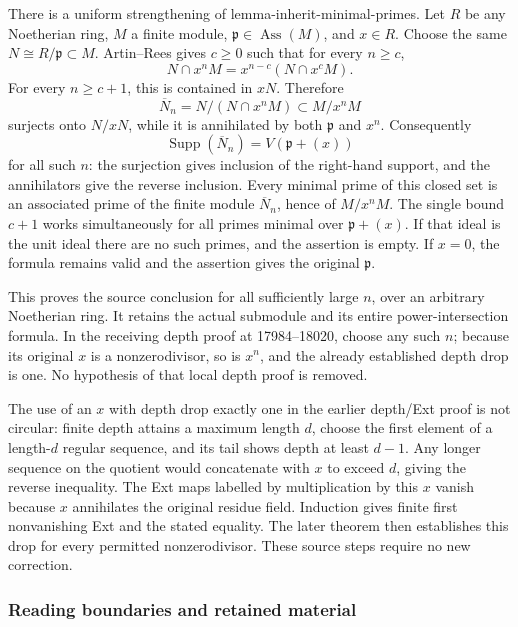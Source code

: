 There is a uniform strengthening of lemma-\AlgebraIdentifierBreak{}inherit-\AlgebraIdentifierBreak{}minimal-\AlgebraIdentifierBreak{}primes. Let \(R\) be any Noetherian ring, \(M\) a finite module, \(\mathfrak p\in\operatorname{Ass}(M)\), and \(x\in R\). Choose the same \(N\cong R/\mathfrak p\subset M\). Artin--Rees gives \(c\geq0\) such that for every \(n\geq c\), \[
N\cap x^nM=x^{n-c}(N\cap x^cM).
\] For every \(n\geq c+1\), this is contained in \(xN\). Therefore \[
\overline N_n=N/(N\cap x^nM)\subset M/x^nM
\] surjects onto \(N/xN\), while it is annihilated by both \(\mathfrak p\) and \(x^n\). Consequently \[
\operatorname{Supp}(\overline N_n)=V(\mathfrak p+(x))
\] for all such \(n\): the surjection gives inclusion of the right-hand support, and the annihilators give the reverse inclusion. Every minimal prime of this closed set is an associated prime of the finite module \(\overline N_n\), hence of \(M/x^nM\). The single bound \(c+1\) works simultaneously for all primes minimal over \(\mathfrak p+(x)\). If that ideal is the unit ideal there are no such primes, and the assertion is empty. If \(x=0\), the formula remains valid and the assertion gives the original \(\mathfrak p\).

This proves the source conclusion for all sufficiently large \(n\), over an arbitrary Noetherian ring. It retains the actual submodule and its entire power-intersection formula. In the receiving depth proof at 17984--18020, choose any such \(n\); because its original \(x\) is a nonzerodivisor, so is \(x^n\), and the already established depth drop is one. No hypothesis of that local depth proof is removed.

The use of an \(x\) with depth drop exactly one in the earlier depth/Ext proof is not circular: finite depth attains a maximum length \(d\), choose the first element of a length-\(d\) regular sequence, and its tail shows depth at least \(d-1\). Any longer sequence on the quotient would concatenate with \(x\) to exceed \(d\), giving the reverse inequality. The Ext maps labelled by multiplication by this \(x\) vanish because \(x\) annihilates the original residue field. Induction gives finite first nonvanishing Ext and the stated equality. The later theorem then establishes this drop for every permitted nonzerodivisor. These source steps require no new correction.

\subsubsection{Reading boundaries and retained material}\label{algebra-proof-007-reading-boundaries-and-retained-material}

